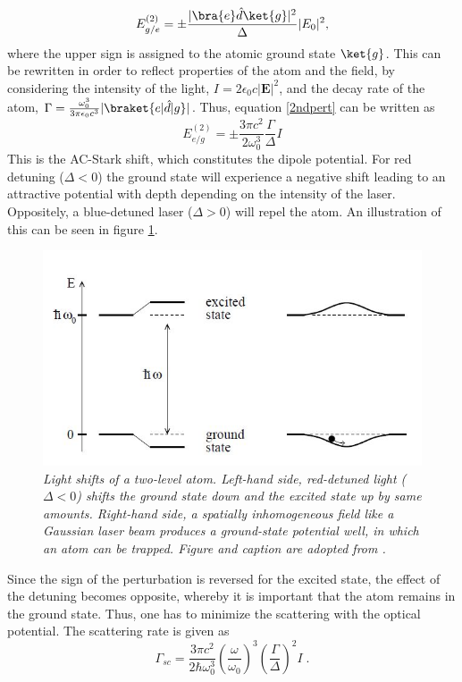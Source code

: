 \begin{equation}
	E_{g/e}^{(2)}=\pm  \frac{ |\bra{e}\hat{d}\ket{g}|^2}{\Delta} |E_0|^2,
	\label{2ndpert}
\end{equation}
where the upper sign is assigned to the atomic ground state $\ket{g}$. This can be rewritten in order to reflect properties of the atom and the field, by considering the intensity of the light, $I = 2 \epsilon_0 c |\boldsymbol{E}|^2 $, and the decay rate of the atom, $\Gamma = \frac{\omega_{0}^3}{3 \pi \epsilon_0 c^3} |\braket{e | \hat{d} | g}|$. Thus, equation \eqref{2ndpert} can be written as \cite{grimm} 
\begin{equation}
	E_{e/g}^{(2)}=\pm \frac{3 \pi c^2}{2 \omega_{0}^3} \frac{\Gamma}{\Delta}I
	\label{eq:dipolepot}
\end{equation}
This is the AC-Stark shift, which constitutes the dipole potential. For red detuning ($\Delta < 0$) the ground state will experience a negative shift leading to an attractive potential with depth depending on the intensity of the laser. Oppositely, a blue-detuned laser ($\Delta > 0$) will repel the atom. An illustration of this can be seen in figure \ref{fig:ac_stark}.
\begin{figure}[!h]
	\centering
	\includegraphics[width=0.5\columnwidth]{Figures/acstark.JPG} 
	\caption{\textit{Light shifts of a two-level atom. Left-hand side,
		red-detuned light ($\Delta < 0$) shifts the ground state down and the
		excited state up by same amounts. Right-hand side, a spatially
		inhomogeneous field like a Gaussian laser beam produces a
		ground-state potential well, in which an atom can be trapped. Figure and 		caption are adopted from \cite{grimm}.}}
	\label{fig:ac_stark} 
\end{figure}
Since the sign of the perturbation is reversed for the excited state, the effect of the detuning becomes opposite, whereby it is important that the atom remains in the ground state. Thus, one has to minimize the scattering with the optical potential. The scattering rate is given as \cite{grimm}
\begin{equation}
	\Gamma_{sc} = \frac{3 \pi c^2}{2 \hbar \omega_{0}^3} \left( \frac{\omega}{\omega_0} \right) ^3 \left( \frac{\Gamma}{\Delta} \right) ^2 I \; .
\end{equation}
